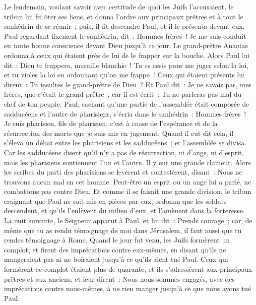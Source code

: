 \begin{multicols}{2}
Le lendemain, voulant savoir avec certitude de quoi les Juifs l'accusaient, le tribun lui fit ôter ses liens, et donna l'ordre aux principaux prêtres et à tout le sanhédrin de se réunir~; puis, il fit descendre Paul, et il le présenta devant eux.
\VerseOne{}Paul regardant fixement le sanhédrin, dit~: Hommes frères~! Je me suis conduit en toute bonne conscience devant Dieu jusqu'à ce jour.
Le grand-prêtre Ananias ordonna à ceux qui étaient près de lui de le frapper sur la bouche.
Alors Paul lui dit~: Dieu te frappera, muraille blanchie~! Tu es assis pour me juger selon la loi, et tu violes la loi en ordonnant qu'on me frappe~!
Ceux qui étaient présents lui dirent~: Tu insultes le grand-prêtre de Dieu~?
Et Paul dit~: Je ne savais pas, mes frères, que c'était le grand-prêtre~; car il est écrit~: Tu ne parleras pas mal du chef de ton peuple.
Paul, sachant qu'une partie de l'assemblée était composée de sadducéens et l'autre de pharisiens, s'écria dans le sanhédrin~: Hommes frères~! Je suis pharisien, fils de pharisien, c'est à cause de l'espérance et de la résurrection des morts que je suis mis en jugement.
Quand il eut dit cela, il s'éleva un débat entre les pharisiens et les sadducéens~; et l'assemblée se divisa.
Car les sadducéens disent qu'il n'y a pas de résurrection, ni d'ange, ni d'esprit, mais les pharisiens soutiennent l'un et l'autre.
Il y eut une grande clameur. Alors les scribes du parti des pharisiens se levèrent et contestèrent, disant~: Nous ne trouvons aucun mal en cet homme. Peut-être un esprit ou un ange lui a parlé, ne combattons pas contre Dieu.
Et comme il se faisait une grande division, le tribun craignant que Paul ne soit mis en pièces par eux, ordonna que les soldats descendent, et qu'ils l'enlèvent du milieu d'eux, et l'amènent dans la forteresse.
La nuit suivante, le Seigneur apparut à Paul, et lui dit~: Prends courage~; car, de même que tu as rendu témoignage de moi dans Jérusalem, il faut aussi que tu rendes témoignage à Rome.
Quand le jour fut venu, les Juifs formèrent un complot, et firent des imprécations contre eux-mêmes, en disant qu'ils ne mangeraient pas ni ne boiraient jusqu'à ce qu'ils aient tué Paul.
Ceux qui formèrent ce complot étaient plus de quarante,
et ils s'adressèrent aux principaux prêtres et aux anciens, et leur dirent~: Nous nous sommes engagés, avec des imprécations contre nous-mêmes, à ne rien manger jusqu'à ce que nous ayons tué Paul.

\end{multicols}
